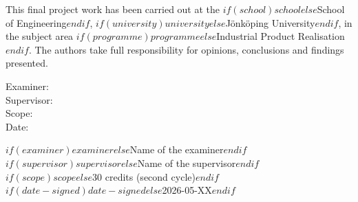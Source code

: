 \clearpage
\thispagestyle{empty}

\null
\vfill

\noindent This final project work has been carried out at the $if(school)$$school$$else$School of Engineering$endif$,
$if(university)$$university$$else$Jönköping University$endif$, in the subject area
$if(programme)$$programme$$else$Industrial Product Realisation$endif$.
The authors take full responsibility for opinions, conclusions and findings presented.

\noindent
\begin{minipage}[t]{0.2\columnwidth}
Examiner:\\
Supervisor:\\
Scope:\\
Date:
\end{minipage}%
\begin{minipage}[t]{0.75\columnwidth}
$if(examiner)$$examiner$$else$Name of the examiner$endif$\\
$if(supervisor)$$supervisor$$else$Name of the supervisor$endif$\\
$if(scope)$$scope$$else$30 credits (second cycle)$endif$\\
$if(date-signed)$$date-signed$$else$2026-05-XX$endif$
\end{minipage}

\clearpage

\clearpairofpagestyles
\cfoot[\pagemark]{\pagemark}
\chead{\leftmark}

{
\setcounter{tocdepth}{3}
\tableofcontents
}

\clearpage
\listoffigures

\clearpage
\listoftables

